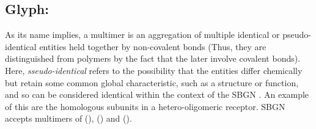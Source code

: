 
\subsection{Glyph: }
\label{sec:multimer}

As its name implies, a multimer is an aggregation of multiple identical or pseudo-identical entities held together by non-covalent bonds (Thus, they are distinguished from polymers by the fact that the later involve covalent bonds). Here,  \emph{sseudo-identical} refers to the possibility that the entities differ chemically but retain some common global characteristic, such as a structure or function, and so can be considered identical within the context of the SBGN \PD.  An example of this are the homologous subunits in a hetero-oligomeric receptor. SBGN \PD accepts multimers of  (),  () and  ().

